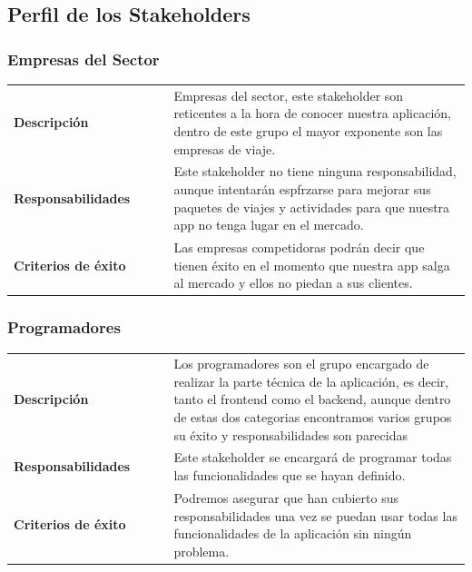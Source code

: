 \documentclass[11pt]{article}
\begin{document}
\subsection{Perfil de los Stakeholders}

\subsubsection{Empresas del Sector}
\begin{table}[H]
  \centering
  \begin{tabular}{p{0.35\linewidth}|p{0.65\linewidth}}
    \toprule
       \textbf{Descripción} & Empresas del sector, este stakeholder son reticentes a la hora de conocer nuestra aplicación, dentro de este grupo el mayor exponente son las empresas de viaje.\\ 
    \textbf{Responsabilidades} & Este stakeholder no tiene ninguna responsabilidad, aunque intentarán espfrzarse para mejorar sus paquetes de viajes y actividades para que nuestra app no tenga lugar en el mercado. \\
    \textbf{Criterios de éxito} & Las empresas competidoras podrán decir que tienen éxito en el momento que nuestra app salga al mercado y ellos no piedan a sus clientes. \\
    \bottomrule
  \end{tabular}
\end{table}

\subsubsection{Programadores}
\begin{table}[H]
  \centering
  \begin{tabular}{p{0.35\linewidth}|p{0.65\linewidth}}
    \toprule
    \textbf{Descripción} & Los programadores son el grupo encargado de realizar la parte técnica de la aplicación, es decir, tanto el frontend como el backend, aunque dentro de estas dos categorias encontramos varios grupos su éxito y responsabilidades son parecidas\\ 
    \textbf{Responsabilidades} & Este stakeholder se encargará de programar todas las funcionalidades que se hayan definido. \\
    \textbf{Criterios de éxito} & Podremos asegurar que han cubierto sus responsabilidades una vez se puedan usar todas las funcionalidades de la aplicación sin ningún problema. \\
    \bottomrule
  \end{tabular}
\end{table}
\end{document}
